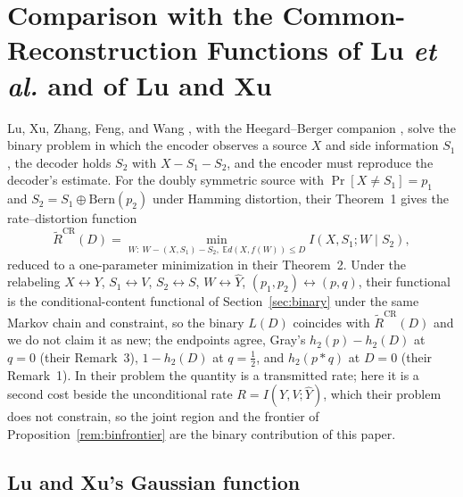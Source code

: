 \documentclass[11pt,onecolumn]{IEEEtran}
\newcommand{\E}{\mathbb{E}}
\newcommand{\hY}{\widehat{Y}}
\begin{document}
\section{Comparison with the Common-Reconstruction Functions of Lu \emph{et al.} and of Lu and Xu}
\label{app:lucompare}

Lu, Xu, Zhang, Feng, and Wang \cite{lu2016lossy}, with the Heegard--Berger
companion \cite{lu2016binary}, solve the binary problem in which the encoder
observes a source $X$ and side information $S_1$, the decoder holds $S_2$
with $X-S_1-S_2$, and the encoder must reproduce the decoder's estimate.
For the doubly symmetric source with $\Pr[X\ne S_1]=p_1$ and
$S_2=S_1\oplus\mathrm{Bern}(p_2)$ under Hamming distortion, their
Theorem~1 gives the rate--distortion function
\[
  \widetilde R^{\mathrm{CR}}(D)
  =\min_{W:\ W-(X,S_1)-S_2,\ \E d(X,f(W))\le D} I(X,S_1;W\mid S_2),
\]
reduced to a one-parameter minimization in their Theorem~2. Under the
relabeling $X\leftrightarrow Y$, $S_1\leftrightarrow V$, $S_2\leftrightarrow S$,
$W\leftrightarrow\hY$, $(p_1,p_2)\leftrightarrow(p,q)$, their functional is the
conditional-content functional of Section~\ref{sec:binary} under the same
Markov chain and constraint, so the binary $L(D)$ coincides with
$\widetilde R^{\mathrm{CR}}(D)$ and we do not claim it as new; the
endpoints agree, Gray's $h_2(p)-h_2(D)$ at $q=0$ (their Remark~3), $1-h_2(D)$
at $q=\tfrac12$, and $h_2(p*q)$ at $D=0$ (their Remark~1). In their problem the
quantity is a transmitted rate; here it is a second cost beside the
unconditional rate $R=I(Y,V;\hY)$, which their problem does not constrain,
so the joint region and the frontier of Proposition~\ref{rem:binfrontier}
are the binary contribution of this paper.

\subsection*{Lu and Xu's Gaussian function}
\end{document}
